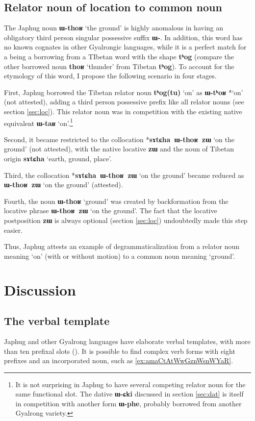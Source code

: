 \documentclass[oldfontcommands,oneside,a4paper,11pt]{article}
\newcommand{\ipa}[1]{\mbox{\phon\textbf{#1}}} %
\begin{document}
 \subsection{Relator noun of location to common noun}

The Japhug noun \ipa{ɯ-thoʁ} `the ground' is highly anomalous in having an obligatory third person singular possessive suffix \ipa{ɯ-}. In addition, this word has no known cognates in other Gyalrongic languages, while it is a perfect match for a being a borrowing from a TIbetan word with the shape \ipa{tʰog} (compare the other borrowed noun \ipa{thoʁ} `thunder' from Tibetan \ipa{tʰog}). To account for the etymology of this word, I propose the following scenario in four stages.

First, Japhug borrowed the Tibetan relator noun  \ipa{tʰog(tu)} `on' as \ipa{ɯ-tʰoʁ} *`on' (not attested), adding a third person possessive prefix like all relator nouns (see section \ref{sec:loc}). This relator noun was in competition with the existing native equivalent \ipa{ɯ-taʁ} `on'.\footnote{It is not surprising in Japhug to have several competing relator noun for the same functional slot. The dative \ipa{ɯ-ɕki} discussed in section \ref{sec:dat} is itself in competition with another form \ipa{ɯ-phe}, probably borrowed from another Gyalrong variety.  }
  
  Second, it  became restricted to the collocation *\ipa{sɤtɕha ɯ-thoʁ zɯ} `on the ground' (not attested), with the native locative \ipa{zɯ} and the  noun of Tibetan origin \ipa{sɤtɕha} `earth, ground, place'.
  
    Third, the collocation *\ipa{sɤtɕha ɯ-thoʁ zɯ} `on the ground' became reduced as \ipa{ɯ-thoʁ zɯ} `on the ground' (attested).
 
 Fourth, the noun \ipa{ɯ-thoʁ} `ground' was created by backformation from the locative phrase \ipa{ɯ-thoʁ zɯ} `on the ground'. The fact that the locative postposition \ipa{zɯ} is always optional (section \ref{sec:loc}) undoubtedly made this step easier.
 
 Thus, Japhug attests an example of degrammaticalization from a relator noun meaning `on' (with or without motion) to a common noun meaning `ground'.
 
    \section{Discussion} 



\subsection{The verbal template} \label{sec:template}
 Japhug and other Gyalrong languages have elaborate verbal templates, with more than ten prefixal slots (\citealt{jacques13harmonization}). It is possible to find complex verb forms with eight prefixes and an incorporated noun, such as \ref{ex:amaCtAtWwGznWsnWYaR}.
 
\end{document}
